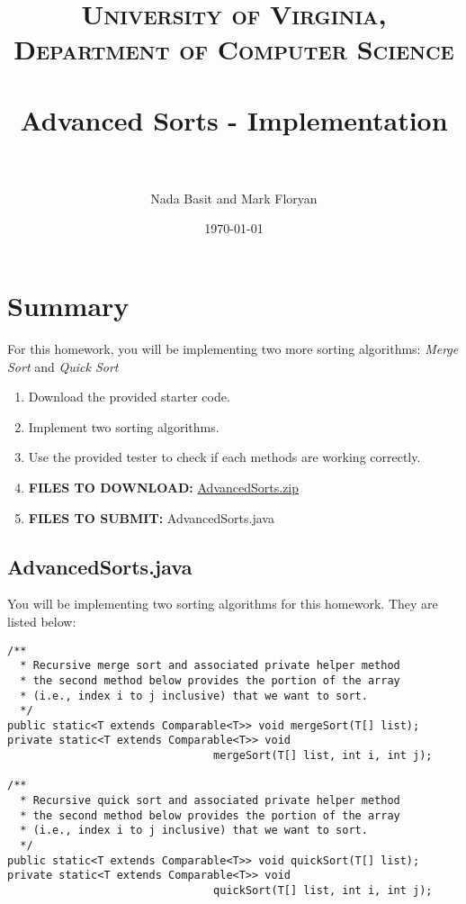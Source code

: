 \documentclass[paper=a4, fontsize=11pt, parskip=full]{scrartcl} %
\title{
\normalfont \normalsize
\textsc{University of Virginia, Department of Computer Science} \\ [25pt] %
\horrule{0.5pt} \\[0.4cm] %
\huge Advanced Sorts - Implementation \\ %
\horrule{2pt} \\[0.5cm] %
}
\author{Nada Basit and Mark Floryan}
\date{\normalsize\today} %
\numberwithin{equation}{section} %
\numberwithin{figure}{section} %
\numberwithin{table}{section} %
\begin{document}
\maketitle %


\section{Summary}

For this homework, you will be implementing two more sorting algorithms: \emph{Merge Sort} and \emph{Quick Sort}

\begin{enumerate}
	\item Download the provided starter code.
	\item Implement two sorting algorithms.
	\item Use the provided tester to check if each methods are working correctly.
	\item \textbf{FILES TO DOWNLOAD:} \href{https://github.com/uva-cs/dsa1/blob/master/homeworks/AdvancedSorts/code/AdvancedSorts.zip?raw=true}{AdvancedSorts.zip}
	\item \textbf{FILES TO SUBMIT:} AdvancedSorts.java
\end{enumerate}


\subsection{AdvancedSorts.java}

You will be implementing two sorting algorithms for this homework. They are listed below:

\begin{lstlisting}
/**
  * Recursive merge sort and associated private helper method
  * the second method below provides the portion of the array
  * (i.e., index i to j inclusive) that we want to sort.
  */
public static<T extends Comparable<T>> void mergeSort(T[] list);
private static<T extends Comparable<T>> void
								mergeSort(T[] list, int i, int j);

/**
  * Recursive quick sort and associated private helper method
  * the second method below provides the portion of the array
  * (i.e., index i to j inclusive) that we want to sort.
  */
public static<T extends Comparable<T>> void quickSort(T[] list);
private static<T extends Comparable<T>> void
								quickSort(T[] list, int i, int j);
\end{lstlisting}
\end{document}
